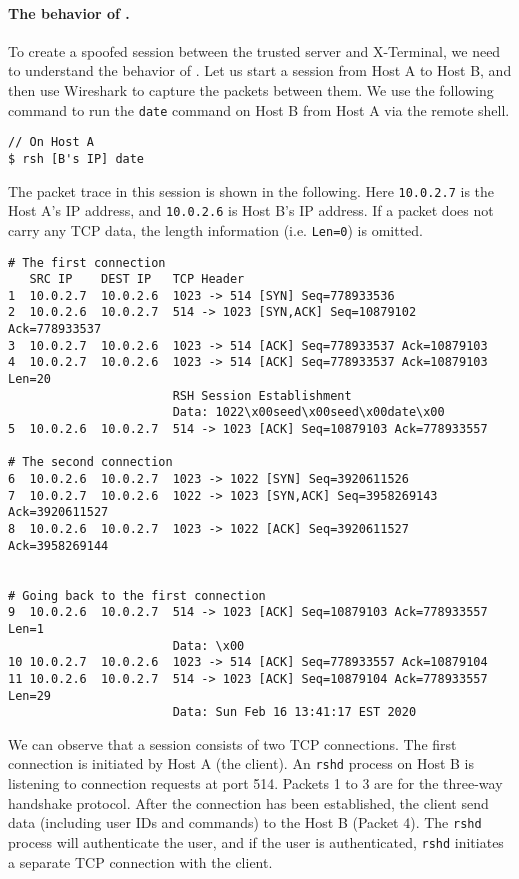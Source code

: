 \paragraph{The behavior of \rsh.} 
To create a spoofed \rsh session between the trusted server and X-Terminal,
we need to understand the behavior of \rsh. Let us start a 
\rsh session from Host A to Host B, and then use Wireshark to 
capture the packets between them. We use the following command to
run the \texttt{date} command on Host B from Host A via the \rsh  
remote shell.


\begin{lstlisting}
// On Host A
$ rsh [B's IP] date
\end{lstlisting}
 
The packet trace in this \rsh session is shown in the following. 
Here \texttt{10.0.2.7} is the Host A's IP address, 
and \texttt{10.0.2.6} is Host B's IP address.
If a packet does not carry any TCP data, the length information (i.e.
\texttt{Len=0}) is omitted. 

\begin{lstlisting}[caption={Packet trace of a \rsh session},
                  label={listing:rsh}]
# The first connection
   SRC IP    DEST IP   TCP Header
1  10.0.2.7  10.0.2.6  1023 -> 514 [SYN] Seq=778933536 
2  10.0.2.6  10.0.2.7  514 -> 1023 [SYN,ACK] Seq=10879102 Ack=778933537 
3  10.0.2.7  10.0.2.6  1023 -> 514 [ACK] Seq=778933537 Ack=10879103 
4  10.0.2.7  10.0.2.6  1023 -> 514 [ACK] Seq=778933537 Ack=10879103 Len=20
                       RSH Session Establishment
                       Data: 1022\x00seed\x00seed\x00date\x00
5  10.0.2.6  10.0.2.7  514 -> 1023 [ACK] Seq=10879103 Ack=778933557

# The second connection
6  10.0.2.6  10.0.2.7  1023 -> 1022 [SYN] Seq=3920611526 
7  10.0.2.7  10.0.2.6  1022 -> 1023 [SYN,ACK] Seq=3958269143 Ack=3920611527 
8  10.0.2.6  10.0.2.7  1023 -> 1022 [ACK] Seq=3920611527 Ack=3958269144 


# Going back to the first connection
9  10.0.2.6  10.0.2.7  514 -> 1023 [ACK] Seq=10879103 Ack=778933557 Len=1
                       Data: \x00
10 10.0.2.7  10.0.2.6  1023 -> 514 [ACK] Seq=778933557 Ack=10879104 
11 10.0.2.6  10.0.2.7  514 -> 1023 [ACK] Seq=10879104 Ack=778933557 Len=29
                       Data: Sun Feb 16 13:41:17 EST 2020
\end{lstlisting}


We can observe that a \rsh session consists of two TCP connections.  
The first connection is initiated by Host A (the client). 
An \texttt{rshd} process on Host B is listening to connection requests at port 514. 
Packets 1 to 3 are for the three-way handshake protocol. 
After the connection has been established, the client 
send \rsh data (including user IDs and commands) to the Host B (Packet 4).
The \texttt{rshd} process will authenticate the user, and 
if the user is authenticated, \texttt{rshd} initiates a
separate TCP connection with the client. 


